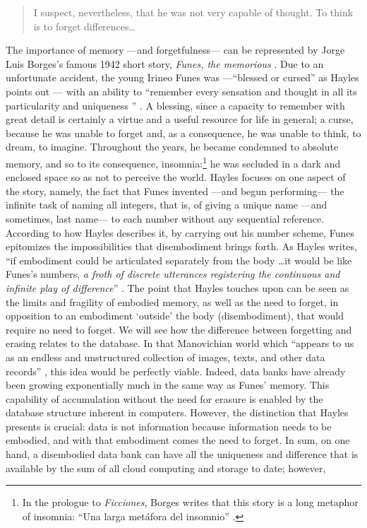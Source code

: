 
% 

\begin{quote}
	I suspect, nevertheless, that he was not very capable of thought. To think is to forget differences\dots \parencite[2]{Bor42:Fun}
\end{quote} %

The importance of memory ---and forgetfulness--- can be represented by Jorge Luis Borges's famous 1942 short story, \textit{Funes, the memorious} \parencite{Bor42:Fun}. Due to an unfortunate accident, the young Irineo Funes was ---``blessed or cursed'' as Hayles points out \parencite[156]{Hay93:The}--- with an ability to ``remember every sensation and thought in all its particularity and uniqueness '' \parencite{Hay93:The}. A blessing, since a capacity to remember with great detail is certainly a virtue and a useful resource for life in general; a curse, because he was unable to forget and, as a consequence, he was unable to think, to dream, to imagine. Throughout the years, he became condemned to absolute memory, and so to its consequence, insomnia:\footnote{In the prologue to \textit{Ficciones}, Borges writes that this story is a long metaphor of insomnia: ``Una larga metáfora del insomnio'' \parencite{Ovi19:Mem}.} he was secluded in a dark and enclosed space so as not to perceive the world. Hayles focuses on one aspect of the story, namely, the fact that Funes invented ---and begun performing--- the infinite task of naming all integers, that is, of giving a unique name ---and sometimes, last name--- to each number without any sequential reference. According to how Hayles describes it, by carrying out his number scheme, Funes epitomizes the impossibilities that disembodiment brings forth. As Hayles writes, ``if embodiment could be articulated separately from the body \dots it would be like Funes's numbers, \textit{a froth of discrete utterances registering the continuous and infinite play of difference}'' \im \parencite[156-159]{Hay93:The}. The point that Hayles touches upon can be seen as the limits and fragility of embodied memory, as well as the need to forget, in opposition to an embodiment `outside' the body (disembodiment), that would require no need to forget. We will see how the difference between forgetting and erasing relates to the database. In that Manovichian world which ``appears to us as an endless and unstructured collection of images, texts, and other data records'' \parencite[219]{Man01:The}, this idea would be perfectly viable. Indeed, data banks have already been growing exponentially much in the same way as Funes' memory. This capability of accumulation without the need for erasure is enabled by the database structure inherent in computers. However, the distinction that Hayles presents is crucial: data is not information because information needs to be embodied, and with that embodiment comes the need to forget. In sum, on one hand, a disembodied data bank can have all the uniqueness and difference that is available by the sum of all cloud computing and storage to date; however, 
